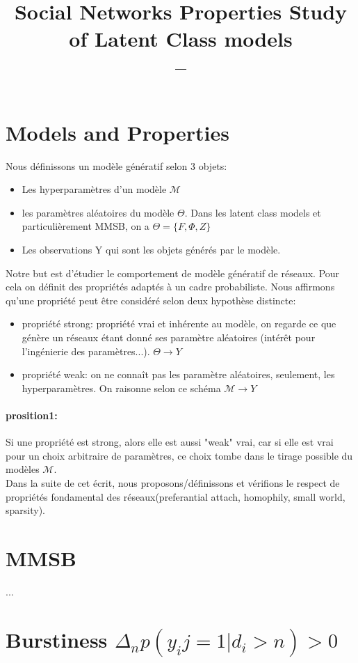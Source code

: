 \documentclass[a4paper, 12pt]{article}
\title{
	\Large{Social Networks Properties Study of Latent Class models}\\
	--\\ }
\begin{document}
\section{Models and Properties}
Nous définissons un modèle génératif selon 3 objets:
\begin{itemize}
\item Les hyperparamètres d'un modèle $\mathcal{M}$
\item les paramètres aléatoires du modèle $\Theta$. Dans les latent class models et particulièrement MMSB, on a $\Theta = \{F, \Phi, Z\}$
\item Les observations Y qui sont les objets générés par le modèle.
\end{itemize}

Notre but est d'étudier le comportement de modèle génératif de réseaux. Pour cela on définit des propriétés adaptés à un cadre probabiliste. Nous affirmons qu'une propriété peut être considéré selon deux hypothèse distincte:
\begin{itemize}
\item propriété strong: propriété vrai et inhérente au modèle, on regarde ce que génère un réseaux étant donné ses paramètre aléatoires (intérêt pour l'ingénierie des paramètres...). $\Theta \longrightarrow Y$
\item propriété weak: on ne connaît pas les paramètre aléatoires, seulement, les hyperparamètres. On raisonne selon ce schéma $\mathcal{M} \longrightarrow Y$
\end{itemize}

\paragraph{prosition1:}
Si une propriété est strong, alors elle est aussi "weak" vrai, car si elle est vrai pour un choix arbitraire de paramètres, ce choix tombe dans le tirage possible du modèles $\mathcal{M}$.\\

Dans la suite de cet écrit, nous proposons/définissons et vérifions le respect de propriétés fondamental des réseaux(preferantial attach, homophily, small world, sparsity).

\section{MMSB}

...

\section{Burstiness $\Delta_n p(y_ij=1|d_i>n) > 0 $}
\end{document}
